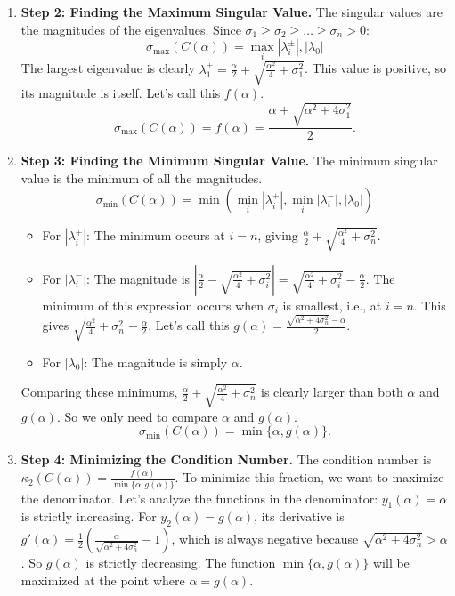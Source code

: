 \begin{solution}
\begin{enumerate}
    \item \textbf{Step 2: Finding the Maximum Singular Value.}
    The singular values are the magnitudes of the eigenvalues. Since $\sigma_1 \ge \sigma_2 \ge \dots \ge \sigma_n > 0$:
    \[ \sigma_{\max}(C(\alpha)) = \max_i |\lambda_i^{\pm}|, |\lambda_0| \]
    The largest eigenvalue is clearly $\lambda_1^{+} = \frac{\alpha}{2} + \sqrt{\frac{\alpha^2}{4} + \sigma_1^2}$. This value is positive, so its magnitude is itself. Let's call this $f(\alpha)$.
    \[ \sigma_{\max}(C(\alpha)) = f(\alpha) = \frac{\alpha + \sqrt{\alpha^2 + 4\sigma_1^2}}{2}. \]

    \item \textbf{Step 3: Finding the Minimum Singular Value.}
    The minimum singular value is the minimum of all the magnitudes.
    \[ \sigma_{\min}(C(\alpha)) = \min \left( \min_{i} |\lambda_i^{+}|, \min_{i} |\lambda_i^{-}|, |\lambda_0| \right) \]
    \begin{itemize}
        \item For $|\lambda_i^{+}|$: The minimum occurs at $i=n$, giving $\frac{\alpha}{2} + \sqrt{\frac{\alpha^2}{4} + \sigma_n^2}$.
        \item For $|\lambda_i^{-}|$: The magnitude is $|\frac{\alpha}{2} - \sqrt{\frac{\alpha^2}{4} + \sigma_i^2}| = \sqrt{\frac{\alpha^2}{4} + \sigma_i^2} - \frac{\alpha}{2}$. The minimum of this expression occurs when $\sigma_i$ is smallest, i.e., at $i=n$. This gives $\sqrt{\frac{\alpha^2}{4} + \sigma_n^2} - \frac{\alpha}{2}$. Let's call this $g(\alpha) = \frac{\sqrt{\alpha^2+4\sigma_n^2}-\alpha}{2}$.
        \item For $|\lambda_0|$: The magnitude is simply $\alpha$.
    \end{itemize}
    Comparing these minimums, $\frac{\alpha}{2} + \sqrt{\frac{\alpha^2}{4} + \sigma_n^2}$ is clearly larger than both $\alpha$ and $g(\alpha)$. So we only need to compare $\alpha$ and $g(\alpha)$.
    \[ \sigma_{\min}(C(\alpha)) = \min\{\alpha, g(\alpha)\}. \]

    \item \textbf{Step 4: Minimizing the Condition Number.}
    The condition number is $\kappa_2(C(\alpha)) = \frac{f(\alpha)}{\min\{\alpha, g(\alpha)\}}$. To minimize this fraction, we want to maximize the denominator.
    Let's analyze the functions in the denominator: $y_1(\alpha) = \alpha$ is strictly increasing. For $y_2(\alpha) = g(\alpha)$, its derivative is $g'(\alpha) = \frac{1}{2}(\frac{\alpha}{\sqrt{\alpha^2+4\sigma_n^2}}-1)$, which is always negative because $\sqrt{\alpha^2+4\sigma_n^2} > \alpha$. So $g(\alpha)$ is strictly decreasing.
    The function $\min\{\alpha, g(\alpha)\}$ will be maximized at the point where $\alpha = g(\alpha)$.
    

\end{enumerate}
\end{solution}
